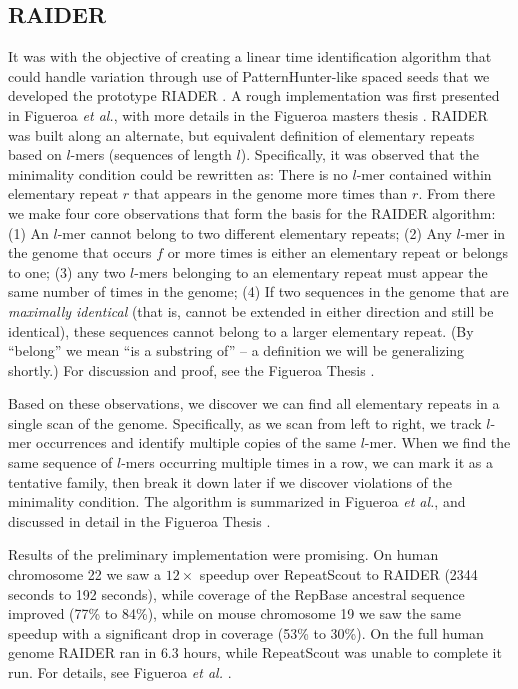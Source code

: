 \documentclass[11pt]{article}
\begin{document}
\subsection*{RAIDER}
\label{RAIDERSec}
It was with the objective of creating a linear time identification
algorithm that could handle variation through use of
PatternHunter-like spaced seeds that we developed the prototype RIADER
\cite{Li:2004wl}.  A rough implementation was first presented in
Figueroa {\it et al.}, with more details in the Figueroa masters
thesis \cite{Figueroa:2014uk,Figueroa:2013cz}.  RAIDER was built along
an alternate, but equivalent definition of elementary repeats based on
$l$-mers (sequences of length $l$).  Specifically, it was observed
that the minimality condition could be rewritten as: There is no
$l$-mer contained within elementary repeat $r$ that appears in the
genome more times than $r$.  From there we make four core observations
that form the basis for the RAIDER algorithm: (1) An $l$-mer cannot
belong to two different elementary repeats; (2) Any $l$-mer in the
genome that occurs $f$ or more times is either an elementary repeat or
belongs to one; (3) any two $l$-mers belonging to an elementary repeat
must appear the same number of times in the genome; (4) If two
sequences in the genome that are {\it maximally identical} (that is,
cannot be extended in either direction and still be identical), these
sequences cannot belong to a larger elementary repeat.  (By ``belong''
we mean ``is a substring of'' -- a definition we will be generalizing
shortly.)  For discussion and proof, see the Figueroa Thesis
\cite{Figueroa:2013cz}.

Based on these observations, we discover we can find all elementary
repeats in a single scan of the genome.  Specifically, as we scan from
left to right, we track $l$-mer occurrences and identify multiple
copies of the same $l$-mer.  When we find the same sequence of $l$-mers
occurring multiple times in a row, we can mark it as a tentative family,
then break it down later if we discover violations of the minimality
condition.  The algorithm is summarized in Figueroa {\it et al.}, and
discussed in detail in the Figueroa Thesis \cite{Figueroa:2014uk,Figueroa:2013cz}.

Results of the preliminary implementation were promising. On human
chromosome 22 we saw a $12\times$ speedup over RepeatScout to RAIDER
(2344 seconds to 192 seconds), while coverage of the RepBase
\cite{Jurka:2005bl} ancestral sequence improved (77\% to 84\%), while
on mouse chromosome 19 we saw the same speedup with a significant drop
in coverage (53\% to 30\%).  On the full human genome RAIDER ran in
$6.3$ hours, while RepeatScout was unable to complete it run.  For
details, see Figueroa {\it et al.} \cite{Figueroa:2014uk}.
\end{document}
